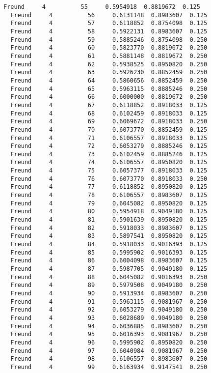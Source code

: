 \documentclass[11pt]{article}
\begin{document}
\begin{Verbatim}[commandchars=\\\{\}]
  Freund     4          55     0.5954918  0.8819672  0.125
  Freund     4          56     0.6131148  0.8983607  0.125
  Freund     4          57     0.6118852  0.8754098  0.125
  Freund     4          58     0.5922131  0.8983607  0.125
  Freund     4          59     0.5885246  0.8754098  0.250
  Freund     4          60     0.5823770  0.8819672  0.250
  Freund     4          61     0.5881148  0.8819672  0.250
  Freund     4          62     0.5938525  0.8950820  0.250
  Freund     4          63     0.5926230  0.8852459  0.250
  Freund     4          64     0.5860656  0.8852459  0.250
  Freund     4          65     0.5963115  0.8885246  0.250
  Freund     4          66     0.6000000  0.8819672  0.250
  Freund     4          67     0.6118852  0.8918033  0.125
  Freund     4          68     0.6102459  0.8918033  0.125
  Freund     4          69     0.6069672  0.8918033  0.250
  Freund     4          70     0.6073770  0.8852459  0.125
  Freund     4          71     0.6106557  0.8918033  0.125
  Freund     4          72     0.6053279  0.8885246  0.125
  Freund     4          73     0.6102459  0.8885246  0.125
  Freund     4          74     0.6106557  0.8950820  0.125
  Freund     4          75     0.6057377  0.8918033  0.125
  Freund     4          76     0.6073770  0.8918033  0.250
  Freund     4          77     0.6118852  0.8950820  0.125
  Freund     4          78     0.6106557  0.8983607  0.125
  Freund     4          79     0.6045082  0.8950820  0.125
  Freund     4          80     0.5954918  0.9049180  0.125
  Freund     4          81     0.5901639  0.8950820  0.125
  Freund     4          82     0.5918033  0.8983607  0.125
  Freund     4          83     0.5897541  0.8950820  0.125
  Freund     4          84     0.5918033  0.9016393  0.125
  Freund     4          85     0.5995902  0.9016393  0.125
  Freund     4          86     0.6004098  0.8983607  0.125
  Freund     4          87     0.5987705  0.9049180  0.125
  Freund     4          88     0.6045082  0.9016393  0.250
  Freund     4          89     0.5979508  0.9049180  0.250
  Freund     4          90     0.5913934  0.8983607  0.250
  Freund     4          91     0.5963115  0.9081967  0.250
  Freund     4          92     0.6053279  0.9049180  0.250
  Freund     4          93     0.6028689  0.9049180  0.250
  Freund     4          94     0.6036885  0.8983607  0.250
  Freund     4          95     0.6016393  0.9081967  0.250
  Freund     4          96     0.5995902  0.8950820  0.250
  Freund     4          97     0.6040984  0.9081967  0.250
  Freund     4          98     0.6106557  0.8983607  0.250
  Freund     4          99     0.6163934  0.9147541  0.250

\end{Verbatim}
\end{document}
